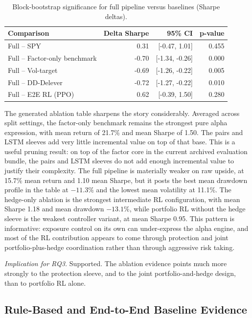 \documentclass[11pt]{article}
\begin{document}
\begin{table}[H]
\centering
\caption{Block-bootstrap significance for full pipeline versus baselines (Sharpe deltas).}
\label{tab:bootstrap_significance}
\begin{tabular}{@{} l r r r @{}}
\toprule
\textbf{Comparison} & \textbf{Delta Sharpe} & \textbf{95\% CI} & \textbf{p-value} \\
\midrule
Full -- SPY                     & 0.31  & [-0.47, 1.01] & 0.455 \\
Full -- Factor-only benchmark   & -0.70 & [-1.34, -0.26] & 0.000 \\
Full -- Vol-target              & -0.69 & [-1.26, -0.22] & 0.005 \\
Full -- DD-Delever              & -0.72 & [-1.27, -0.22] & 0.010 \\
Full -- E2E RL (PPO)            & 0.62  & [-0.39, 1.50] & 0.280 \\
\bottomrule
\end{tabular}
\end{table}

The generated ablation table sharpens the story considerably. Averaged across
split settings, the factor-only benchmark remains the strongest pure alpha expression, with
mean return of 21.7\% and mean Sharpe of 1.50. The pairs and LSTM sleeves add
very little incremental value on top of that base. This is a useful pruning
result: on top of the factor core in the current archived evaluation bundle,
the pairs and LSTM sleeves do not add enough incremental value to justify their
complexity. The full pipeline is
materially weaker on raw upside, at 15.7\%
mean return and 1.10 mean Sharpe, but it posts the best mean drawdown profile
in the table at $-11.3\%$ and the lowest mean volatility at 11.1\%. The
hedge-only ablation is the strongest intermediate RL configuration, with mean
Sharpe 1.18 and mean drawdown $-13.1\%$, while portfolio RL without the hedge
sleeve is the weakest controller variant, at mean Sharpe 0.95. This pattern is
informative: exposure control on its own can under-express the alpha engine, and
most of the RL contribution appears to come through protection and joint
portfolio-plus-hedge coordination rather than through aggressive risk taking.

\noindent\textit{Implication for RQ3.} Supported. The ablation evidence points
much more strongly to the protection sleeve, and to the joint
portfolio-and-hedge design, than to portfolio RL alone.

\subsection{Rule-Based and End-to-End Baseline Evidence}
\end{document}
